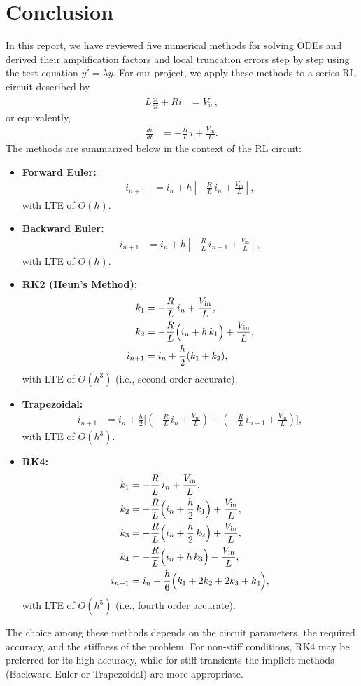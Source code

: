 \documentclass[12pt]{article}
\begin{document}
\section{Conclusion}
In this report, we have reviewed five numerical methods for solving ODEs and derived their amplification factors and local truncation errors step by step using the test equation $y'=\lambda y$. For our project, we apply these methods to a series RL circuit described by 
\begin{align}
L\frac{di}{dt}+Ri &= V_{\text{in}},
\end{align}
or equivalently,
\begin{align}
\frac{di}{dt} &= -\frac{R}{L}\, i + \frac{V_{\text{in}}}{L}.
\end{align}
The methods are summarized below in the context of the RL circuit:
\begin{itemize}
    \item \textbf{Forward Euler:} 
    \begin{align}
    i_{n+1} &= i_n+h\left[-\frac{R}{L}\, i_n+\frac{V_{\text{in}}}{L}\right],
    \end{align}
    with LTE of $O(h)$.
    \item \textbf{Backward Euler:} 
    \begin{align}
    i_{n+1} &= i_n+h\left[-\frac{R}{L}\, i_{n+1}+\frac{V_{\text{in}}}{L}\right],
    \end{align}
    with LTE of $O(h)$.
    \item \textbf{RK2 (Heun's Method):} 
    \begin{align}
    k_1 &= -\frac{R}{L}\, i_n+\frac{V_{\text{in}}}{L}, \\
    k_2 &= -\frac{R}{L}\Bigl(i_n+h\, k_1\Bigr)+\frac{V_{\text{in}}}{L}, \\
    i_{n+1} &= i_n+\frac{h}{2}(k_1+k_2),
    \end{align}
    with LTE of $O(h^3)$ (i.e., second order accurate).
    \item \textbf{Trapezoidal:} 
    \begin{align}
    i_{n+1} &= i_n+\frac{h}{2}\Biggl[\left(-\frac{R}{L}\, i_n+\frac{V_{\text{in}}}{L}\right)+\left(-\frac{R}{L}\, i_{n+1}+\frac{V_{\text{in}}}{L}\right)\Biggr],
    \end{align}
    with LTE of $O(h^3)$.
    \item \textbf{RK4:} 
    \begin{align}
    k_1 &= -\frac{R}{L}\, i_n+\frac{V_{\text{in}}}{L}, \\
    k_2 &= -\frac{R}{L}\Bigl(i_n+\frac{h}{2}\, k_1\Bigr)+\frac{V_{\text{in}}}{L}, \\
    k_3 &= -\frac{R}{L}\Bigl(i_n+\frac{h}{2}\, k_2\Bigr)+\frac{V_{\text{in}}}{L}, \\
    k_4 &= -\frac{R}{L}\Bigl(i_n+h\, k_3\Bigr)+\frac{V_{\text{in}}}{L}, \\
    i_{n+1} &= i_n+\frac{h}{6}\Bigl(k_1+2k_2+2k_3+k_4\Bigr),
    \end{align}
    with LTE of $O(h^5)$ (i.e., fourth order accurate).
\end{itemize}
The choice among these methods depends on the circuit parameters, the required accuracy, and the stiffness of the problem. For non-stiff conditions, RK4 may be preferred for its high accuracy, while for stiff transients the implicit methods (Backward Euler or Trapezoidal) are more appropriate.
\end{document}
